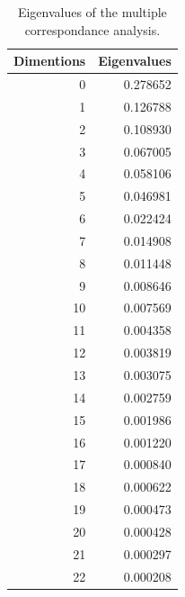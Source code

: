 \documentclass[a4paper,twoside,12pt]{book}
\begin{document}
\begin{appendices}
\begin{table}
\centering
\caption{Eigenvalues of the multiple correspondance analysis.}
\label{id:tab:MCAEigenvalues}
\begin{tabular}{rr}
	\toprule
	 Dimentions &  Eigenvalues \\
	\midrule
			  0 &     0.278652 \\
			  1 &     0.126788 \\
			  2 &     0.108930 \\
			  3 &     0.067005 \\
			  4 &     0.058106 \\
			  5 &     0.046981 \\
			  6 &     0.022424 \\
			  7 &     0.014908 \\
			  8 &     0.011448 \\
			  9 &     0.008646 \\
			 10 &     0.007569 \\
			 11 &     0.004358 \\
			 12 &     0.003819 \\
			 13 &     0.003075 \\
			 14 &     0.002759 \\
			 15 &     0.001986 \\
			 16 &     0.001220 \\
			 17 &     0.000840 \\
			 18 &     0.000622 \\
			 19 &     0.000473 \\
			 20 &     0.000428 \\
			 21 &     0.000297 \\
			 22 &     0.000208 \\
	\bottomrule
	\end{tabular}
\end{table} 


\end{appendices}
\end{document}
